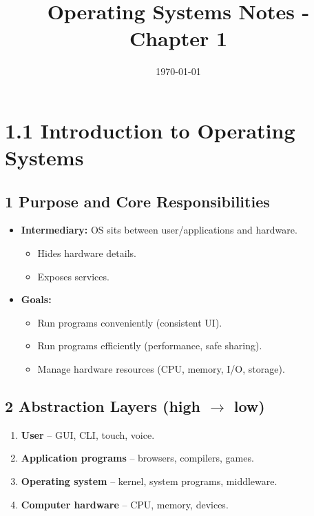 \documentclass{article}
\title{Operating Systems Notes - Chapter 1}
\author{} %
\date{\today}
\begin{document}
\linespread{1.0}\selectfont %
\maketitle
\tableofcontents
\newpage
\linespread{0.8}\selectfont %
\section*{1.1 Introduction to Operating Systems}
\subsection*{1 Purpose and Core Responsibilities}
\begin{itemize}
    \item \textbf{Intermediary:} OS sits between user/applications and hardware.
    \begin{itemize}
        \item Hides hardware details.
        \item Exposes services.
    \end{itemize}
    \item \textbf{Goals:}
    \begin{itemize}
        \item Run programs conveniently (consistent UI).
        \item Run programs efficiently (performance, safe sharing).
        \item Manage hardware resources (CPU, memory, I/O, storage).
    \end{itemize}
\end{itemize}

\subsection*{2 Abstraction Layers (high $\rightarrow$ low)}
\begin{enumerate}[label=\arabic*.]
    \item \textbf{User} – GUI, CLI, touch, voice.
    \item \textbf{Application programs} – browsers, compilers, games.
    \item \textbf{Operating system} – kernel, system programs, middleware.
    \item \textbf{Computer hardware} – CPU, memory, devices.
\end{enumerate}
\end{document}
